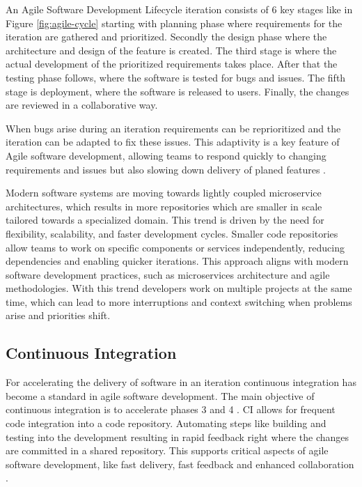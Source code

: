 An Agile Software Development Lifecycle iteration consists of 6 key stages like in Figure \ref{fig:agile-cycle} starting with planning phase where requirements for the iteration are gathered and prioritized. Secondly the design phase where the architecture and design of the feature is created. The third stage is where the actual development of the prioritized requirements takes place. After that the testing phase follows, where the software is tested for bugs and issues. The fifth stage is deployment, where the software is released to users. Finally, the changes are reviewed in a collaborative way.

When bugs arise during an iteration requirements can be reprioritized and the iteration can be adapted to fix these issues. This adaptivity is a key feature of Agile software development, allowing teams to respond quickly to changing requirements and issues but also slowing down delivery of planed features \cite{rupareliaSoftwareDevelopmentLifecycle2010}.

Modern software systems are moving towards lightly coupled microservice architectures, which results in more repositories which are smaller in scale tailored towards a specialized domain. This trend is driven by the need for flexibility, scalability, and faster development cycles. Smaller code repositories allow teams to work on specific components or services independently, reducing dependencies and enabling quicker iterations. This approach aligns with modern software development practices, such as microservices architecture and agile methodologies.
With this trend developers work on multiple projects at the same time, which can lead to more interruptions and context switching when problems arise and priorities shift.


\subsection{Continuous Integration}
For accelerating the delivery of software in an iteration continuous integration has become a standard in agile software development. The main objective of continuous integration is to accelerate phases 3 and 4 \cite{ugwuezeContinuousIntegrationDeployment2024}. CI allows for frequent code integration into a code repository. Automating steps like building and testing into the development resulting in rapid feedback right where the changes are committed in a shared repository. This supports critical aspects of agile software development, like fast delivery, fast feedback and enhanced collaboration \cite{ugwuezeContinuousIntegrationDeployment2024}.

